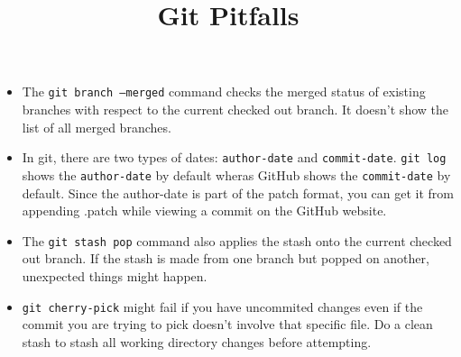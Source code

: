 \documentclass{../template/texnote}
\title{Git Pitfalls}
\begin{document}
    \maketitle {}

	\begin{itemize}
		\item The \texttt{git branch --merged} command checks the merged status of existing branches with respect to the current checked out branch. It doesn't show the list of all merged branches.
		\item In git, there are two types of dates: \texttt{author-date} and \texttt{commit-date}. \texttt{git log} shows the \texttt{author-date} by default wheras GitHub shows the \texttt{commit-date} by default. Since the author-date is part of the patch format, you can get it from appending .patch while viewing a commit on the GitHub website.
		\item The \texttt{git stash pop} command also applies the stash onto the current checked out branch. If the stash is made from one branch but popped on another, unexpected things might happen.
		\item \texttt{git cherry-pick} might fail if you have uncommited changes even if the commit you are trying to pick doesn't involve that specific file. Do a clean stash to stash all working directory changes before attempting.
	\end{itemize}
    \printbibliography
\end{document}
